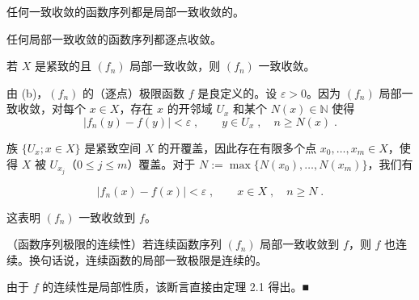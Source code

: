 \begin{remark}

\begin{items}
\item

任何一致收敛的函数序列都是局部一致收敛的。

\item

任何局部一致收敛的函数序列都逐点收敛。

\item

若 $X$ 是紧致的且 $(f_{n})$ 局部一致收敛，则 $(f_{n})$ 一致收敛。

\proofhead
由 (b)，$(f_n)$ 的（逐点）极限函数 $f$ 是良定义的。设 $\varepsilon > 0$。因为 $(f_n)$ 局部一致收敛，对每个 $x \in X$，存在 $x$ 的开邻域 $U_x$ 和某个 $N(x) \in \mathbb{N}$ 使得
\[
|f_{n}(y)-f(y)|<\varepsilon\;,\qquad y\in U_{x}\;,\quad n\geq N(x)\;.
\]

族 $\{U_x; x \in X\}$ 是紧致空间 $X$ 的开覆盖，因此存在有限多个点 $x_0, \ldots, x_m \in X$，使得 $X$ 被 $U_{x_j}$（$0 \leq j \leq m$）覆盖。对于 $N := \max\{N(x_0), \ldots, N(x_m)\}$，我们有

\[
|f_{n}(x)-f(x)|<\varepsilon\;,\qquad x\in X\;,\quad n\geq N\;.
\]

这表明 $ (f_{n}) $ 一致收敛到 $ f $。

\end{items}

\end{remark}

\begin{theorem}

（函数序列极限的连续性）若连续函数序列 $ (f_n) $ 局部一致收敛到 $ f $，则 $ f $ 也连续。换句话说，连续函数的局部一致极限是连续的。

\proofhead
由于 $ f $ 的连续性是局部性质，该断言直接由定理 2.1 得出。■
\end{theorem}

